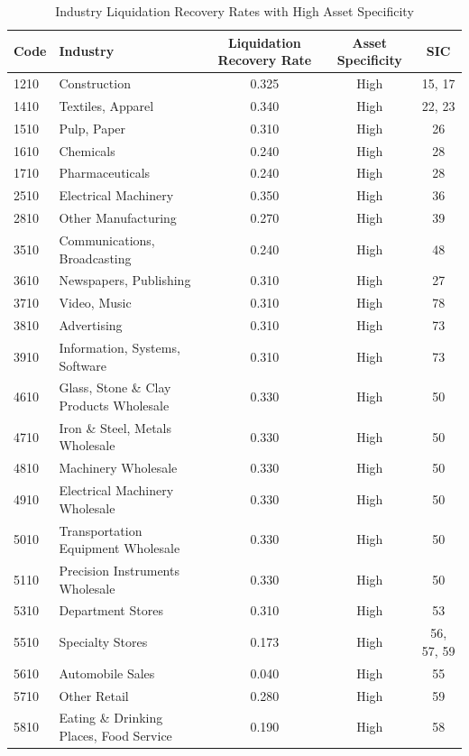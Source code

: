 \begin{table}[ht]
\centering
\caption{Industry Liquidation Recovery Rates with High Asset Specificity}
\label{tab:SpecificityHigh}
\centering
\begin{threeparttable}
\begin{tabular}{llccc}
\toprule
\textbf{Code} & \textbf{Industry} & \textbf{Liquidation Recovery Rate} & \textbf{Asset Specificity} & \textbf{SIC} \\
\midrule
1210 & Construction & 0.325 & High & 15, 17 \\
1410 & Textiles, Apparel & 0.340 & High & 22, 23 \\
1510 & Pulp, Paper & 0.310 & High & 26 \\
1610 & Chemicals & 0.240 & High & 28 \\
1710 & Pharmaceuticals & 0.240 & High & 28 \\
2510 & Electrical Machinery & 0.350 & High & 36 \\
2810 & Other Manufacturing & 0.270 & High & 39 \\
3510 & Communications, Broadcasting & 0.240 & High & 48 \\
3610 & Newspapers, Publishing & 0.310 & High & 27 \\
3710 & Video, Music & 0.310 & High & 78 \\
3810 & Advertising & 0.310 & High & 73 \\
3910 & Information, Systems, Software & 0.310 & High & 73 \\
4610 & Glass, Stone \& Clay Products Wholesale & 0.330 & High & 50 \\
4710 & Iron \& Steel, Metals Wholesale & 0.330 & High & 50 \\
4810 & Machinery Wholesale & 0.330 & High & 50 \\
4910 & Electrical Machinery Wholesale & 0.330 & High & 50 \\
5010 & Transportation Equipment Wholesale & 0.330 & High & 50 \\
5110 & Precision Instruments Wholesale & 0.330 & High & 50 \\
5310 & Department Stores & 0.310 & High & 53 \\
5510 & Specialty Stores & 0.173 & High & 56, 57, 59 \\
5610 & Automobile Sales & 0.040 & High & 55 \\
5710 & Other Retail & 0.280 & High & 59 \\
5810 & Eating \& Drinking Places, Food Service & 0.190 & High & 58 \\

\end{tabular}
\end{threeparttable}
\end{table}
